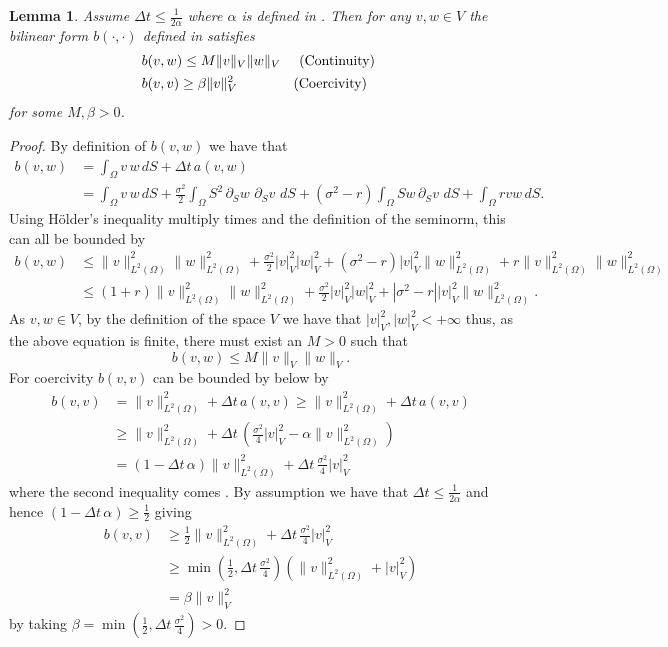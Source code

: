 \documentclass{article}
\newtheorem{lemma}[thm]{Lemma}
\newcommand{\intS}[1]{\ensuremath{\int_{\Omega}#1 \, dS}}
\newcommand{\darg}[2]{\ensuremath{\, \partial_{#2}#1} \, }
\newcommand{\dS}[1]{\ensuremath{\darg{#1}{S}}}
\newcommand{\sigmafrac}{\ensuremath{\frac{\sigma^2}{2}}}
\newcommand{\seminormsq}[1]{\ensuremath{|#1|_V^2}}
\newcommand{\normsq}[1]{\ensuremath{\|#1\|_{L^2(\Omega)}^2}}
\newcommand{\aform}[2]{\ensuremath{\sigmafrac \intS{S^2 \dS{#2} \dS{#1}} + (\sigma^2 - r) \intS{S #2 \dS{#1}} + \intS{r  #1  #2}}}
\begin{document}
\begin{lemma}\label{lemma:b_lax_assump}
    Assume $\Delta t \leq \frac{1}{2\alpha}$ where $\alpha$ is defined in . Then for any $v,w \in V$ the bilinear form $b(\cdot, \cdot)$ defined in  satisfies
    \begin{align*}
        & b(v,w) \leq M \| v\|_V \| w\|_V \quad \text{ (Continuity) }\\
        &b(v,v) \geq \beta \| v\|_V^2 \qquad \hspace{6mm} \text{ (Coercivity) }
    \end{align*}
    for some $M,\beta>0$.
\end{lemma}
\begin{proof}
    By definition of $b(v, w)$ we have that
    \begin{align*}
        b(v,w) &= \intS{v\,w} + \Delta t\,a(v,w)\\
        &= \intS{v\,w} + \aform{v}{w}.
    \end{align*}
    Using Hölder's inequality multiply times and the definition of the seminorm, this can all be bounded by
    \begin{align*}
        b(v,w)  &\leq \normsq{v}\normsq{w} + \sigmafrac\seminormsq{v}\seminormsq{w} + (\sigma^2 - r ) \seminormsq{v}\normsq{w} + r \normsq{v} \normsq{w}\\
        &\leq (1+r)\normsq{v} \normsq{w}+ \sigmafrac\seminormsq{v}\seminormsq{w} + \left|\sigma^2 - r\right| \seminormsq{v}\normsq{w}.
    \end{align*}
    As $v,w \in V$, by the definition of the space $V$ we have that $\seminormsq{v}, \seminormsq{w} < + \infty$ thus, as the above equation is finite, there must exist an $M >0$ such that
    \begin{equation*}
        b(v,w)  \leq M \| v\|_V \| w\|_V.
    \end{equation*}
    For coercivity $b(v, v)$ can be bounded by below by
    \begin{align*}
        b(v, v) &= \normsq{v} + \Delta t\, a(v,v) \geq \normsq{v} + \Delta t\, a(v,v)\\
        & \geq \normsq{v} + \Delta t\, \left( \frac{\sigma^2}{4} \seminormsq{v} - \alpha \normsq{v} \right) \\
        &= \left(1 - \Delta t \, \alpha  \right) \normsq{v} +\Delta t\, \frac{\sigma^2}{4} \seminormsq{v}
    \end{align*}
    where the second inequality comes . By assumption we have that $\Delta t \leq \frac{1}{2\alpha}$ and hence $\left(1 - \Delta t \, \alpha  \right) \geq \frac{1}{2}$ giving
    \begin{align*}
        b(v, v) &\geq \frac{1}{2}\normsq{v} +\Delta t\, \frac{\sigma^2}{4} \seminormsq{v}\\
        & \geq \min\left(\frac{1}{2}, \Delta t\,\frac{\sigma^2}{4}\right) \left( \normsq{v} +  \seminormsq{v}\right)\\
        &= \beta \| v\|_V^2
    \end{align*}
    by taking $\beta = \min\left(\frac{1}{2}, \Delta t\,\frac{\sigma^2}{4}\right) > 0$. \qedhere
\end{proof}
\end{document}
